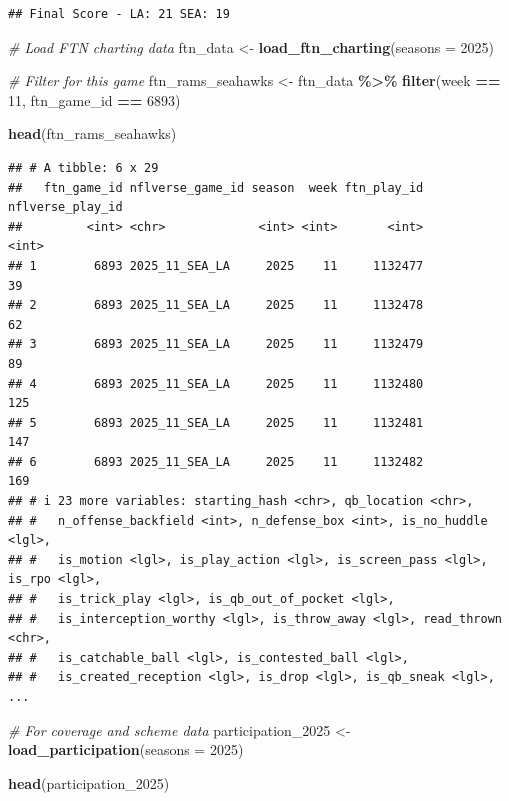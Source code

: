 \documentclass[
]{article}
\newenvironment{Shaded}{\begin{snugshade}}{\end{snugshade}}
\newcommand{\AttributeTok}[1]{\textcolor[rgb]{0.13,0.29,0.53}{#1}}
\newcommand{\CommentTok}[1]{\textcolor[rgb]{0.56,0.35,0.01}{\textit{#1}}}
\newcommand{\DecValTok}[1]{\textcolor[rgb]{0.00,0.00,0.81}{#1}}
\newcommand{\FunctionTok}[1]{\textcolor[rgb]{0.13,0.29,0.53}{\textbf{#1}}}
\newcommand{\NormalTok}[1]{#1}
\newcommand{\OtherTok}[1]{\textcolor[rgb]{0.56,0.35,0.01}{#1}}
\newcommand{\SpecialCharTok}[1]{\textcolor[rgb]{0.81,0.36,0.00}{\textbf{#1}}}
\begin{document}
\begin{verbatim}
## Final Score - LA: 21 SEA: 19
\end{verbatim}

\begin{Shaded}
\begin{Highlighting}[]
\CommentTok{\# Load FTN charting data}
\NormalTok{ftn\_data }\OtherTok{\textless{}{-}} \FunctionTok{load\_ftn\_charting}\NormalTok{(}\AttributeTok{seasons =} \DecValTok{2025}\NormalTok{)}
\end{Highlighting}
\end{Shaded}

\begin{Shaded}
\begin{Highlighting}[]
\CommentTok{\# Filter for this game}
\NormalTok{ftn\_rams\_seahawks }\OtherTok{\textless{}{-}}\NormalTok{ ftn\_data }\SpecialCharTok{\%\textgreater{}\%}
  \FunctionTok{filter}\NormalTok{(week }\SpecialCharTok{==} \DecValTok{11}\NormalTok{, ftn\_game\_id }\SpecialCharTok{==} \DecValTok{6893}\NormalTok{)}

\FunctionTok{head}\NormalTok{(ftn\_rams\_seahawks)}
\end{Highlighting}
\end{Shaded}

\begin{verbatim}
## # A tibble: 6 x 29
##   ftn_game_id nflverse_game_id season  week ftn_play_id nflverse_play_id
##         <int> <chr>             <int> <int>       <int>            <int>
## 1        6893 2025_11_SEA_LA     2025    11     1132477               39
## 2        6893 2025_11_SEA_LA     2025    11     1132478               62
## 3        6893 2025_11_SEA_LA     2025    11     1132479               89
## 4        6893 2025_11_SEA_LA     2025    11     1132480              125
## 5        6893 2025_11_SEA_LA     2025    11     1132481              147
## 6        6893 2025_11_SEA_LA     2025    11     1132482              169
## # i 23 more variables: starting_hash <chr>, qb_location <chr>,
## #   n_offense_backfield <int>, n_defense_box <int>, is_no_huddle <lgl>,
## #   is_motion <lgl>, is_play_action <lgl>, is_screen_pass <lgl>, is_rpo <lgl>,
## #   is_trick_play <lgl>, is_qb_out_of_pocket <lgl>,
## #   is_interception_worthy <lgl>, is_throw_away <lgl>, read_thrown <chr>,
## #   is_catchable_ball <lgl>, is_contested_ball <lgl>,
## #   is_created_reception <lgl>, is_drop <lgl>, is_qb_sneak <lgl>, ...
\end{verbatim}

\begin{Shaded}
\begin{Highlighting}[]
\CommentTok{\# For coverage and scheme data}
\NormalTok{participation\_2025 }\OtherTok{\textless{}{-}} \FunctionTok{load\_participation}\NormalTok{(}\AttributeTok{seasons =} \DecValTok{2025}\NormalTok{)}

\FunctionTok{head}\NormalTok{(participation\_2025)}
\end{Highlighting}
\end{Shaded}
\end{document}
